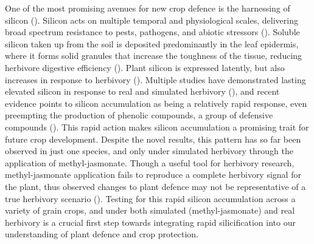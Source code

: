 \documentclass[12pt, letterpaper, ]{report}
\begin{document}
One of the most promising avenues for new crop defence is the harnessing of silicon (\cite{reynolds_silicon_2016}). Silicon acts on multiple temporal and physiological scales, delivering broad spectrum resistance to pests, pathogens, and abiotic stressors (\cite{cooke_consistent_2016,coskun_controversies_2019}). Soluble silicon taken up from the soil is deposited predominantly in the leaf epidermis, where it forms solid granules that increase the toughness of the tissue, reducing herbivore digestive efficiency (\cite{cooke_is_2011}). Plant silicon is expressed latently, but also increases in response to herbivory (\cite{takahashi_possibility_1990, }). Multiple studies have demonstrated lasting elevated silicon in response to real and simulated herbivory (\cite{massey_are_2008,hartley_ecology_2016}), and recent evidence points to silicon accumulation as being a relatively rapid response, even preempting the production of phenolic compounds, a group of defensive compounds (\cite{waterman_short-term_2021}). This rapid action makes silicon accumulation a promising trait for future crop development. Despite the novel results, this pattern has so far been observed in just one species, and only under simulated herbivory through the application of methyl-jasmonate. Though a useful tool for herbivory research, methyl-jasmonate application fails to reproduce a complete herbivory signal for the plant, thus observed changes to plant defence may not be representative of a true herbivory scenario (\cite{strauss_direct_2002}). Testing for this rapid silicon accumulation across a variety of grain crops, and under both simulated (methyl-jasmonate) and real herbivory is a crucial first step towards integrating rapid silicification into our understanding of plant defence and crop protection.
\end{document}
